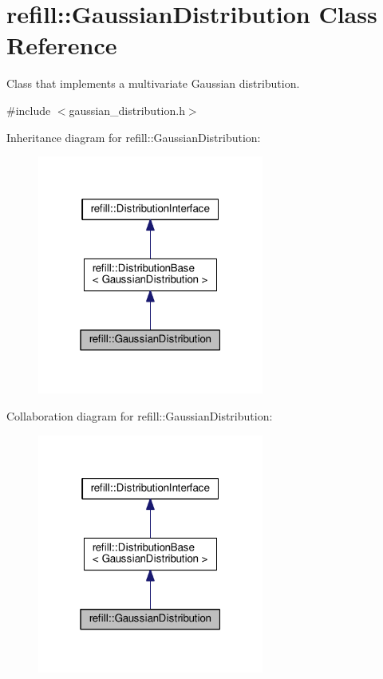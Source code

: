 \hypertarget{classrefill_1_1GaussianDistribution}{}\section{refill\+:\+:Gaussian\+Distribution Class Reference}
\label{classrefill_1_1GaussianDistribution}


Class that implements a multivariate Gaussian distribution.  




{\ttfamily \#include $<$gaussian\+\_\+distribution.\+h$>$}



Inheritance diagram for refill\+:\+:Gaussian\+Distribution\+:\nopagebreak
\begin{figure}[H]
\begin{center}
\leavevmode
\includegraphics[width=211pt]{classrefill_1_1GaussianDistribution__inherit__graph}
\end{center}
\end{figure}


Collaboration diagram for refill\+:\+:Gaussian\+Distribution\+:\nopagebreak
\begin{figure}[H]
\begin{center}
\leavevmode
\includegraphics[width=211pt]{classrefill_1_1GaussianDistribution__coll__graph}
\end{center}
\end{figure}
